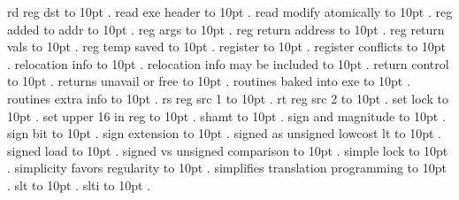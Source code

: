 rd reg dst \leaders\hbox to 10pt {\hss.\hss}  \hfill {}
\smallskip
read exe header \leaders\hbox to 10pt {\hss.\hss}  \hfill {}
\smallskip
read modify atomically \leaders\hbox to 10pt {\hss.\hss}  \hfill {}
\smallskip
reg added to addr \leaders\hbox to 10pt {\hss.\hss}  \hfill {}
\smallskip
reg args \leaders\hbox to 10pt {\hss.\hss}  \hfill {}
\smallskip
reg return address \leaders\hbox to 10pt {\hss.\hss}  \hfill {}
\smallskip
reg return vals \leaders\hbox to 10pt {\hss.\hss}  \hfill {}
\smallskip
reg temp saved \leaders\hbox to 10pt {\hss.\hss}  \hfill {}
\smallskip
register \leaders\hbox to 10pt {\hss.\hss}  \hfill {}
\smallskip
register conflicts \leaders\hbox to 10pt {\hss.\hss}  \hfill {}
\smallskip
relocation info \leaders\hbox to 10pt {\hss.\hss}  \hfill {}
\smallskip
relocation info may be included \leaders\hbox to 10pt {\hss.\hss}  \hfill {}
\smallskip
return control \leaders\hbox to 10pt {\hss.\hss}  \hfill {}
\smallskip
returns unavail or free \leaders\hbox to 10pt {\hss.\hss}  \hfill {}
\smallskip
routines baked into exe \leaders\hbox to 10pt {\hss.\hss}  \hfill {}
\smallskip
routines extra info \leaders\hbox to 10pt {\hss.\hss}  \hfill {}
\smallskip
rs reg src 1 \leaders\hbox to 10pt {\hss.\hss}  \hfill {}
\smallskip
rt reg src 2 \leaders\hbox to 10pt {\hss.\hss}  \hfill {}
\smallskip
set lock \leaders\hbox to 10pt {\hss.\hss}  \hfill {}
\smallskip
set upper 16 in reg \leaders\hbox to 10pt {\hss.\hss}  \hfill {}
\smallskip
shamt \leaders\hbox to 10pt {\hss.\hss}  \hfill {}
\smallskip
sign and magnitude \leaders\hbox to 10pt {\hss.\hss}  \hfill {}
\smallskip
sign bit \leaders\hbox to 10pt {\hss.\hss}  \hfill {}
\smallskip
sign extension \leaders\hbox to 10pt {\hss.\hss}  \hfill {}
\smallskip
signed as unsigned lowcost lt \leaders\hbox to 10pt {\hss.\hss}  \hfill {}
\smallskip
signed load \leaders\hbox to 10pt {\hss.\hss}  \hfill {}
\smallskip
signed vs unsigned comparison \leaders\hbox to 10pt {\hss.\hss}  \hfill {}
\smallskip
simple lock \leaders\hbox to 10pt {\hss.\hss}  \hfill {}
\smallskip
simplicity favors regularity \leaders\hbox to 10pt {\hss.\hss}  \hfill {}
\smallskip
simplifies translation programming \leaders\hbox to 10pt {\hss.\hss}  \hfill {}
\smallskip
slt \leaders\hbox to 10pt {\hss.\hss}  \hfill {}
\smallskip
slti \leaders\hbox to 10pt {\hss.\hss}  \hfill {}
